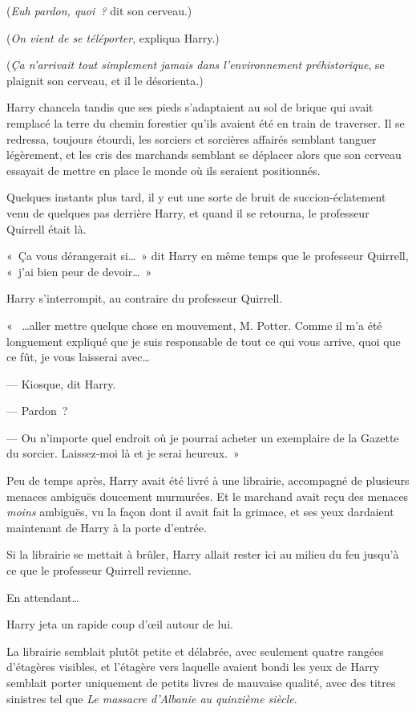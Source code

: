 (\emph{Euh pardon, quoi~?} dit son cerveau.)

(\emph{On vient de se téléporter}, expliqua Harry.)

(\emph{Ça n'arrivait tout simplement jamais dans l'environnement préhistorique}, se plaignit son cerveau, et il le désorienta.)

Harry chancela tandis que ses pieds s'adaptaient au sol de brique qui avait remplacé la terre du chemin forestier qu'ils avaient été en train de traverser. Il se redressa, toujours étourdi, les sorciers et sorcières affairés semblant tanguer légèrement, et les cris des marchands semblant se déplacer alors que son cerveau essayait de mettre en place le monde où ils seraient positionnés.

Quelques instants plus tard, il y eut une sorte de bruit de succion-éclatement venu de quelques pas derrière Harry, et quand il se retourna, le professeur Quirrell était là.

«~Ça vous dérangerait si…~» dit Harry en même temps que le professeur Quirrell, «~j'ai bien peur de devoir…~»

Harry s'interrompit, au contraire du professeur Quirrell.

«~ …aller mettre quelque chose en mouvement, M. Potter. Comme il m'a été longuement expliqué que je suis responsable de tout ce qui vous arrive, quoi que ce fût, je vous laisserai avec…

--- Kiosque, dit Harry.

--- Pardon~?

--- Ou n'importe quel endroit où je pourrai acheter un exemplaire de la Gazette du sorcier. Laissez-moi là et je serai heureux.~»

Peu de temps après, Harry avait été livré à une librairie, accompagné de plusieurs menaces ambiguës doucement murmurées. Et le marchand avait reçu des menaces \emph{moins} ambiguës, vu la façon dont il avait fait la grimace, et ses yeux dardaient maintenant de Harry à la porte d'entrée.

Si la librairie se mettait à brûler, Harry allait rester ici au milieu du feu jusqu'à ce que le professeur Quirrell revienne.

En attendant…

Harry jeta un rapide coup d'œil autour de lui.

La librairie semblait plutôt petite et délabrée, avec seulement quatre rangées d'étagères visibles, et l'étagère vers laquelle avaient bondi les yeux de Harry semblait porter uniquement de petits livres de mauvaise qualité, avec des titres sinistres tel que \emph{Le massacre d'Albanie au quinzième siècle}.

